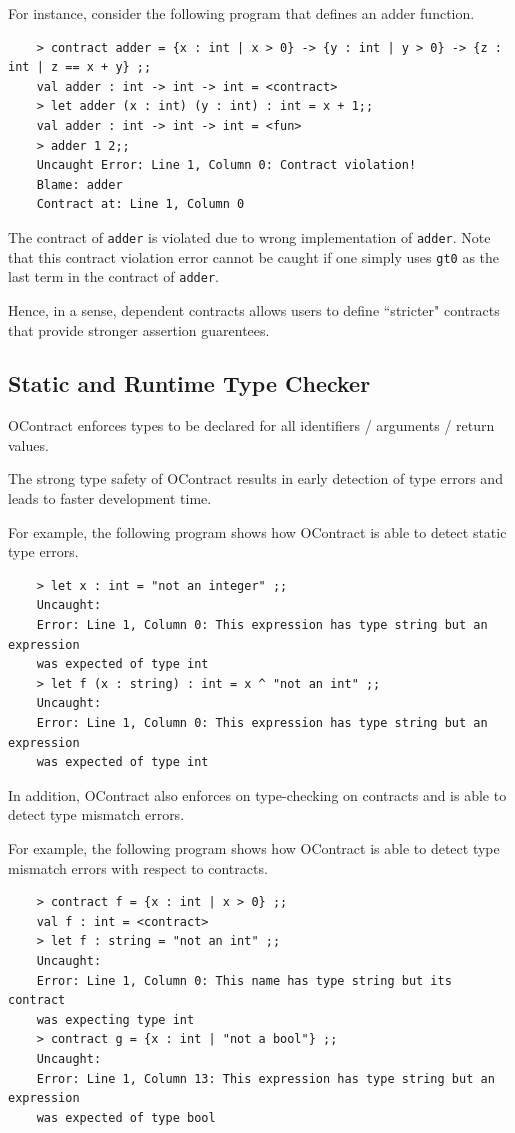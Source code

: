 \documentclass[a4paper]{article}
\begin{document}
For instance, consider the following program that defines an adder function.

\begin{verbatim}
    > contract adder = {x : int | x > 0} -> {y : int | y > 0} -> {z : int | z == x + y} ;;
    val adder : int -> int -> int = <contract>
    > let adder (x : int) (y : int) : int = x + 1;;
    val adder : int -> int -> int = <fun>
    > adder 1 2;;
    Uncaught Error: Line 1, Column 0: Contract violation!
    Blame: adder
    Contract at: Line 1, Column 0
\end{verbatim}

The contract of \texttt{adder} is violated due to wrong implementation of \texttt{adder}.
Note that this contract violation error cannot be caught if one simply uses \texttt{gt0} as the last term in the contract of \texttt{adder}.

Hence, in a sense, dependent contracts allows users to define ``stricter" contracts that provide stronger assertion guarentees.

\subsection{Static and Runtime Type Checker}

OContract enforces types to be declared for all identifiers / arguments / return values.

The strong type safety of OContract results in early detection of type errors and leads to faster development time.

For example, the following program shows how OContract is able to detect static type errors.

\begin{verbatim}
    > let x : int = "not an integer" ;;
    Uncaught:
    Error: Line 1, Column 0: This expression has type string but an expression
    was expected of type int
    > let f (x : string) : int = x ^ "not an int" ;;
    Uncaught:
    Error: Line 1, Column 0: This expression has type string but an expression
    was expected of type int
\end{verbatim}

In addition, OContract also enforces on type-checking on contracts and is able to detect type mismatch errors.

For example, the following program shows how OContract is able to detect type mismatch errors with respect to contracts.

\begin{verbatim}
    > contract f = {x : int | x > 0} ;;
    val f : int = <contract>
    > let f : string = "not an int" ;;
    Uncaught:
    Error: Line 1, Column 0: This name has type string but its contract
    was expecting type int
    > contract g = {x : int | "not a bool"} ;;
    Uncaught:
    Error: Line 1, Column 13: This expression has type string but an expression
    was expected of type bool
\end{verbatim}
\end{document}

